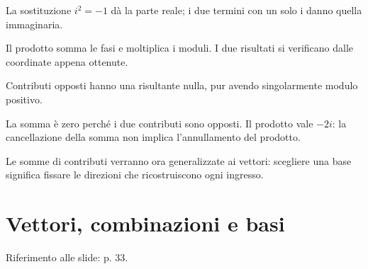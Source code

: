 La sostituzione \(i^{2}=- 1\) dà la parte reale; i due termini con un solo i danno quella immaginaria.\par


\label{c2-prodotto-complesso-example-2-step-3}


Il prodotto somma le fasi e moltiplica i moduli. I due risultati si verificano dalle coordinate appena ottenute.\par


\label{c2-prodotto-complesso-example-2-step-4}


Contributi opposti hanno una risultante nulla, pur avendo singolarmente modulo positivo.\par



La somma è zero perché i due contributi sono opposti. Il prodotto vale \(- 2i\): la cancellazione della somma non implica l'annullamento del prodotto.\par


Le somme di contributi verranno ora generalizzate ai vettori: scegliere una base significa fissare le direzioni che ricostruiscono ogni ingresso.\par



\Needspace{.43\textheight}
\section{Vettori, combinazioni e basi}
\label{c2-basi}

{\sffamily\small\color{Ink!70} Riferimento alle slide: p. 33.\par}

